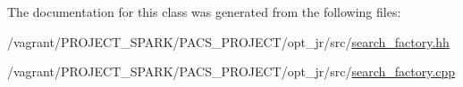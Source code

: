 The documentation for this class was generated from the following files\-:\begin{DoxyCompactItemize}
\item 
/vagrant/\-P\-R\-O\-J\-E\-C\-T\-\_\-\-S\-P\-A\-R\-K/\-P\-A\-C\-S\-\_\-\-P\-R\-O\-J\-E\-C\-T/opt\-\_\-jr/src/\hyperlink{search__factory_8hh}{search\-\_\-factory.\-hh}\item 
/vagrant/\-P\-R\-O\-J\-E\-C\-T\-\_\-\-S\-P\-A\-R\-K/\-P\-A\-C\-S\-\_\-\-P\-R\-O\-J\-E\-C\-T/opt\-\_\-jr/src/\hyperlink{search__factory_8cpp}{search\-\_\-factory.\-cpp}\end{DoxyCompactItemize}
